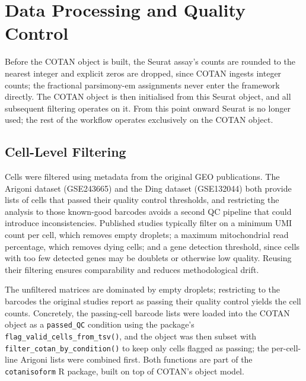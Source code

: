 \section{Data Processing and Quality Control}\label{sec:data-filtering}

Before the COTAN object is built, the Seurat assay's counts are rounded to the nearest integer and explicit zeros are dropped, since COTAN ingests integer counts; the fractional parsimony-em assignments never enter the framework directly. The COTAN object is then initialised from this Seurat object, and all subsequent filtering operates on it. From this point onward Seurat is no longer used; the rest of the workflow operates exclusively on the COTAN object.

\subsection*{Cell-Level Filtering}

Cells were filtered using metadata from the original GEO publications. The Arigoni dataset (GSE243665\cite{arigoni2024benchmark}) and the Ding dataset (GSE132044\cite{ding2020systematic}) both provide lists of cells that passed their quality control thresholds, and restricting the analysis to those known-good barcodes avoids a second QC pipeline that could introduce inconsistencies. Published studies typically filter on a minimum UMI count per cell, which removes empty droplets; a maximum mitochondrial read percentage, which removes dying cells; and a gene detection threshold, since cells with too few detected genes may be doublets or otherwise low quality. Reusing their filtering ensures comparability and reduces methodological drift.

The unfiltered matrices are dominated by empty droplets; restricting to the barcodes the original studies report as passing their quality control yields the cell counts. Concretely, the passing-cell barcode lists were loaded into the COTAN object as a \texttt{passed\_QC} condition using the package's \texttt{flag\_valid\_cells\_from\-\_tsv()}, and the object was then subset with \texttt{filter\_cotan\_by\-\_condition()} to keep only cells flagged as passing; the per-cell-line Arigoni lists were combined first. Both functions are part of the \texttt{cotanisoform} R package\cite{ldelitala2026scisoform}, built on top of COTAN's object model.

